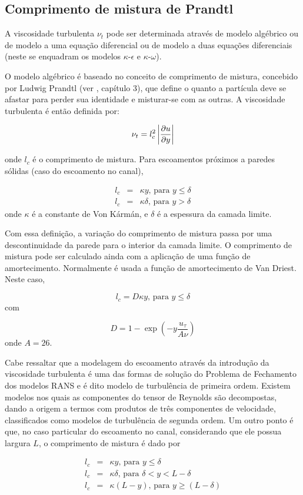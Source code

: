 \subsection{Comprimento de mistura de Prandtl}

A viscosidade turbulenta $\nu_t$ pode ser determinada através de modelo algébrico ou de modelo a uma equação diferencial ou de modelo a duas equações diferenciais (neste se enquadram os modelos $\kappa$-$\epsilon$ e $\kappa$-$\omega$).

O modelo algébrico é baseado no conceito de comprimento de mistura,
concebido por Ludwig Prandtl (ver \citet{FREIRE02}, capítulo 3), que
define o quanto a partícula deve se afastar para perder sua identidade e
misturar-se com as outras. A viscosidade turbulenta é então definida
por:

\begin{equation}
  \nu_t = l_c^2\left|\frac{\partial u}{\partial y}\right|
\end{equation}

onde $l_c$ é o comprimento de mistura. Para escoamentos próximos a
paredes sólidas (caso do escoamento no canal), 

\begin{subequations}
  \begin{eqnarray}
    l_c&=&\kappa y\text{, para }y\leq\delta\\
    l_c&=&\kappa \delta\text{, para }y>\delta
  \end{eqnarray}
\end{subequations}
onde $\kappa$ é a constante de Von Kármán, e $\delta$ é a espessura da camada limite.

Com essa definição, a variação do comprimento de mistura passa por uma descontinuidade da parede para o interior da camada limite. O comprimento de mistura pode ser calculado ainda com a aplicação de uma função de amortecimento. Normalmente é usada a função de amortecimento de Van Driest. Neste caso,

\begin{equation}
  l_c=D\kappa y\text{, para }y\leq\delta
\end{equation}
com

\begin{equation}
  D = 1-\exp\left(-y\frac{u_{\tau}}{A\nu}\right)
\end{equation}
onde $A = 26$.

Cabe ressaltar que a modelagem do escoamento através da introdução da viscosidade turbulenta é uma das formas de solução do Problema de Fechamento dos modelos RANS e é dito modelo de turbulência de primeira ordem. Existem modelos nos quais as componentes do tensor de Reynolds são decompostas, dando a origem a termos com produtos de três componentes de velocidade, classificados como modelos de turbulência de segunda ordem. Um outro ponto é que, no caso particular do escoamento no canal, considerando que ele possua largura $L$, o comprimento de mistura é dado por

\begin{subequations}
  \begin{eqnarray}
    l_c &=& \kappa y\text{, para }y\leq\delta\\
    l_c &=& \kappa \delta\text{, para }\delta<y<L-\delta\\
    l_c &=& \kappa(L-y)\text{, para }y\geq(L-\delta)
  \end{eqnarray}
\end{subequations}


